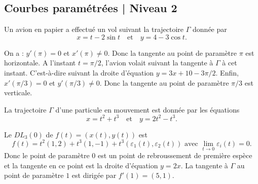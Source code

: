 \subsection{Courbes paramétrées | Niveau 2}

\begin{question}
Un avion en papier a effectué un vol suivant la trajectoire $\Gamma$ donnée par
$$x=t-2\sin t\quad \mbox{et} \quad y=4-3\cos t.$$
\begin{answers}  
\end{answers}
\begin{explanations}
On a : $y'(\pi)=0$ et $x'(\pi)\neq 0$. Donc la tangente au point de paramètre $\pi$ est horizontale. A l'instant $t=\pi/2$, l'avion volait suivant la tangente \`a $\Gamma$ à cet instant. C'est-à-dire suivant la droite d'équation $y=3x+10-3\pi /2$. Enfin, $x'(\pi/3)=0$ et $y'(\pi/3)\neq 0$. Donc la tangente au point de paramètre $\pi/3$ est verticale.
\end{explanations}
\end{question}

\begin{question}
La trajectoire $\Gamma$ d'une particule en mouvement est donnée par les équations
$$x=t^2+t^3\quad \mbox{et} \quad  y=2t^2-t^3.$$
\begin{answers}  
\end{answers}
\begin{explanations}
Le $DL_3(0)$ de $f(t)=(x(t),y(t))$ est 
$$f(t)=t^2(1,2)+t^3(1,-1)+t^3\left(\varepsilon_1(t),\varepsilon_2(t)\right)\mbox{ avec }\lim _{t\to 0}\varepsilon_i(t)=0.$$
Donc le point de paramètre $0$ est un point de rebroussement de première espèce et la tangente en ce point est la droite d'équation $y=2x$. La tangente à $\Gamma$ au point de paramètre $1$ est dirigée par $f'(1)=(5,1)$.
\end{explanations}
\end{question}


